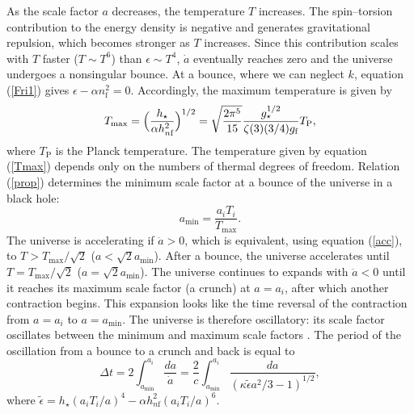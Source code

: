 \documentclass[prd,onecolumn,nofootinbib]{revtex4}
\begin{document}
As the scale factor $a$ decreases, the temperature $T$ increases.
The spin--torsion contribution to the energy density is negative and generates gravitational repulsion, which becomes stronger as $T$ increases.
Since this contribution scales with $T$ faster ($T\sim T^6$) than $\epsilon\sim T^4$, $\dot{a}$ eventually reaches zero and the universe undergoes a nonsingular bounce.
At a bounce, where we can neglect $k$, equation (\ref{Fri1}) gives $\epsilon-\alpha n_\textrm{f}^2=0$.
Accordingly, the maximum temperature is given by
\begin{equation}
T_\textrm{max}=\Bigl(\frac{h_\star}{\alpha h_{n\textrm{f}}^2}\Bigr)^{1/2}=\sqrt{\frac{2\pi^5}{15}}\frac{g_\star^{1/2}}{\zeta(3)(3/4)g_\textrm{f}}T_\textrm{P},
\label{Tmax}
\end{equation}
where $T_\textrm{P}$ is the Planck temperature.
The temperature given by equation (\ref{Tmax}) depends only on the numbers of thermal degrees of freedom.
Relation (\ref{prop}) determines the minimum scale factor at a bounce of the universe in a black hole:
\begin{equation}
a_\textrm{min}=\frac{a_i T_i}{T_\textrm{max}}.
\end{equation}
The universe is accelerating if $\ddot{a}>0$, which is equivalent, using equation (\ref{acc}), to $T>T_\textrm{max}/\sqrt{2}$ ($a<\sqrt{2}a_\textrm{min}$).
After a bounce, the universe accelerates until $T=T_\textrm{max}/\sqrt{2}$ ($a=\sqrt{2}a_\textrm{min}$).
The universe continues to expands with $\ddot{a}<0$ until it reaches its maximum scale factor (a crunch) at $a=a_i$, after which another contraction begins.
This expansion looks like the time reversal of the contraction from $a=a_i$ to $a=a_\textrm{min}$.
The universe is therefore oscillatory: its scale factor oscillates between the minimum and maximum scale factors \cite{Kuc}.
The period of the oscillation from a bounce to a crunch and back is equal to
\begin{equation}
\Delta t=2\int_{a_\textrm{min}}^{a_i}\frac{da}{\dot{a}}=\frac{2}{c}\int_{a_\textrm{min}}^{a_i}\frac{da}{(\kappa\tilde{\epsilon}a^2/3-1)^{1/2}},
\end{equation}
where $\tilde{\epsilon}=h_\star(a_i T_i/a)^4-\alpha h_{n\textrm{f}}^2(a_i T_i/a)^6$.
\end{document}
